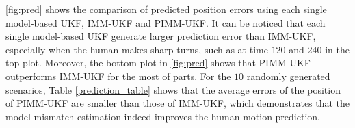 \documentclass[journal]{IEEEtran}
\newcommand{\todohere}[1]{\hl{(\textbf{TODO:} #1)}}
\DeclareRobustCommand{\clnote}[1]{\ifthenelse{\boolean{include-notes}}%
{\textcolor{orange}{\textbf{CL: #1}}}{}}
\DeclareRobustCommand{\dhnote}[1]{\ifthenelse{\boolean{include-notes}}%
{\textcolor{blue}{\textbf{DH: #1}}}{}}
\begin{document}
    	\cref{fig:pred} shows the comparison of predicted position errors using each single model-based UKF, IMM-UKF and PIMM-UKF.
	It can be noticed that each single model-based UKF generate larger prediction error than IMM-UKF, especially when the human makes sharp turns, such as at time $120$ and $240$ in the top plot.
Moreover, the bottom plot in \cref{fig:pred} shows that PIMM-UKF outperforms IMM-UKF for the most of parts. For the $10$ randomly generated scenarios, Table \ref{prediction_table} shows that the average errors of the position of PIMM-UKF are smaller than those of IMM-UKF, which demonstrates that the model mismatch estimation indeed improves the human motion prediction. 

      
\end{document}
